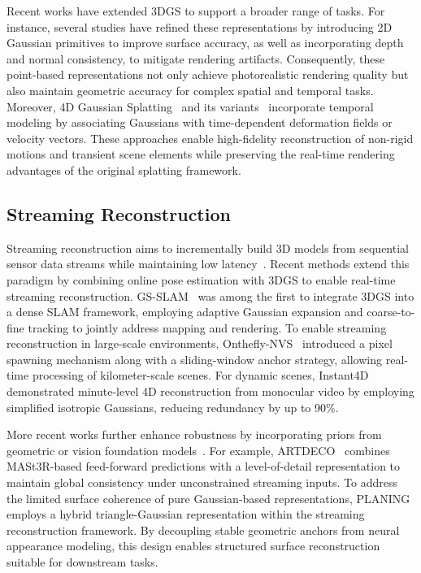 Recent works have extended 3DGS to support a broader range of tasks. For instance, several studies have refined these representations by introducing 2D Gaussian primitives \cite{huang20242d, dai2024high} to improve surface accuracy, as well as incorporating depth and normal consistency, to mitigate rendering artifacts. Consequently, these point-based representations not only achieve photorealistic rendering quality but also maintain geometric accuracy for complex spatial and temporal tasks.
Moreover, 4D Gaussian Splatting~\cite{wu20244d} and its variants~\cite{lin2024gaussian,li2024spacetime,zhu2024motiongs} incorporate temporal modeling by associating Gaussians with time-dependent deformation fields or velocity vectors. These approaches enable high-fidelity reconstruction of non-rigid motions and transient scene elements while preserving the real-time rendering advantages of the original splatting framework. 

\subsection{Streaming Reconstruction}
Streaming reconstruction aims to incrementally build 3D models from sequential sensor data streams while maintaining low latency~\cite{wang2026towards}. Recent methods extend this paradigm by combining online pose estimation with 3DGS to enable real-time streaming reconstruction. GS-SLAM~\cite{yan2024gs} was among the first to integrate 3DGS into a dense SLAM framework, employing adaptive Gaussian expansion and coarse-to-fine tracking to jointly address mapping and rendering. To enable streaming reconstruction in large-scale environments, Onthefly-NVS~\cite{meuleman2025fly} introduced a pixel spawning mechanism along with a sliding-window anchor strategy, allowing real-time processing of kilometer-scale scenes. For dynamic scenes, Instant4D~\cite{luo2025instant4d} demonstrated minute-level 4D reconstruction from monocular video by employing simplified isotropic Gaussians, reducing redundancy by up to 90\%. 

More recent works further enhance robustness by incorporating priors from geometric or vision foundation models~\cite{artdeco, jiang2026planing, cheng2025outdoor, zhangflash}. 
For example, ARTDECO~\cite{artdeco} combines MASt3R-based feed-forward predictions with a level-of-detail representation to maintain global consistency under unconstrained streaming inputs. 
To address the limited surface coherence of pure Gaussian-based representations, PLANING~\cite{jiang2026planing} employs a hybrid triangle-Gaussian representation within the streaming reconstruction framework. 
By decoupling stable geometric anchors from neural appearance modeling, this design enables structured surface reconstruction suitable for downstream tasks.